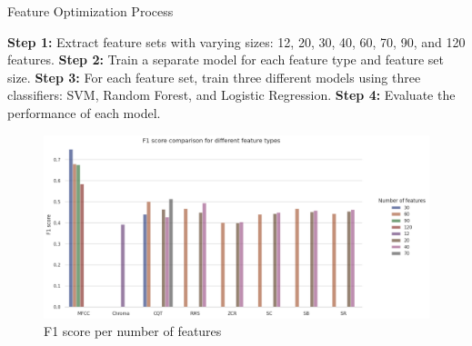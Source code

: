 \begin{algorithm}
    \caption{Feature Optimization Process}
    \begin{algorithmic}[1]
        \State \textbf{Step 1:} Extract feature sets with varying sizes: 12, 20, 30, 40, 60, 70, 90, and 120 features.
        \State \textbf{Step 2:} Train a separate model for each feature type and feature set size.
        \State \textbf{Step 3:} For each feature set, train three different models using three classifiers: SVM, Random Forest,
        and Logistic Regression.
        \State \textbf{Step 4:} Evaluate the performance of each model.
    \end{algorithmic}
\end{algorithm}

\begin{figure}[htbp]
    \centering
    \includegraphics[width=\textwidth]{../images/n_feature_per_type.png}
    \caption{F1 score per number of features}
    \label{fig:n_feature_per_type}
\end{figure}

